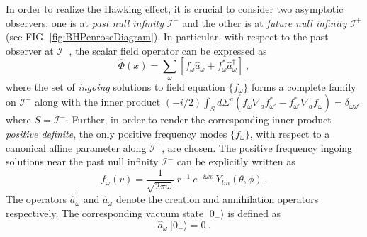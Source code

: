 \documentclass[aps,12pt,showpacs]{revtex4-2}
\def\scriplus{\mathscr{I}^{+}}
\def\scriminus{\mathscr{I}^{-}}
\begin{document}
In order to realize the Hawking effect, it is crucial to consider two 
asymptotic observers: one is at \emph{past null infinity} $\scriminus$ and the 
other is at \emph{future null infinity} $\scriplus$ 
(see FIG. \ref{fig:BHPenroseDiagram}). In particular, with respect to the past 
observer at $\scriminus$, the scalar field operator can be expressed as 
%
\begin{equation}\label{ScalarFieldPastOperator}
\hat{\Phi}(x) = \sum_{\omega} \left[ 
{f}_{\omega} \hat{a}_{\omega} + {f}^{*}_{\omega} \hat{a}^{\dagger}_{\omega} 
\right] ~,
\end{equation}
%
where the set of \emph{ingoing} solutions to field equation $\{{f}_{\omega}\}$ 
forms a complete family on $\scriminus$ along with the inner product
$(-i/2)\int_{S}d\Sigma^{a} \left({f}_{\omega} \nabla_a 
{f}^{*}_{\omega'} -
{f}^{*}_{\omega'} \nabla_a {f}_{\omega} \right) = \delta_{\omega\omega'}$ 
where $S=\scriminus$.
%
Further, in order to render the corresponding inner product \emph{positive 
definite}, the only positive frequency modes $\{{f}_{\omega}\}$, with respect 
to a canonical affine parameter along $\scriminus$, are chosen. The positive 
frequency ingoing solutions near the past null infinity $\scriminus$ can be 
explicitly written as
%
\begin{equation}\label{IngoingSolution}
{f}_{\omega}(v) = \frac{1}{\sqrt{2\pi\omega}} ~ r^{-1}~ 
e^{-i\omega v} ~Y_{lm}(\theta,\phi) ~.
\end{equation}
%
The operators $\hat{a}^{\dagger}_{\omega}$ and $\hat{a}_{\omega}$ denote the 
creation and annihilation operators respectively. The corresponding vacuum state 
$|0_{-}\rangle$ is defined as
%
\begin{equation}\label{VacuumMinus}
\hat{a}_{\omega}~|0_{-}\rangle = 0 ~.
\end{equation}
%
\end{document}
